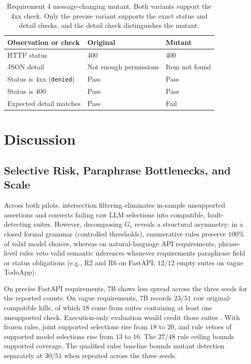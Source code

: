 \documentclass[sigconf,nonacm]{acmart}
\begin{document}
\begin{table}[t]
\caption{Requirement 4 message-changing mutant. Both variants support the 4xx check. Only the precise variant supports the exact status and detail checks, and the detail check distinguishes the mutant.}
\label{tab:example}
\centering\small
\begin{tabular}{@{}p{} p{} p{}@{}}
\toprule
Observation or check & Original & Mutant\\
\midrule
HTTP status & 400 & 400\\
JSON detail & {\raggedright Not enough permissions\par} & {\raggedright Item not found\par}\\
Status is 4xx (\texttt{denied}) & Pass & Pass\\
Status is 400 & Pass & Pass\\
Expected detail matches & Pass & Fail\\
\bottomrule
\end{tabular}
\end{table}

\section{Discussion}
\subsection{Selective Risk, Paraphrase Bottlenecks, and Scale}
Across both pilots, intersection filtering eliminates in-sample unsupported assertions and converts failing raw LLM selections into compatible, fault-detecting suites. However, decomposing $G_r$ reveals a structural asymmetry: in a closed formal grammar (controlled thresholds), enumerative rules preserve $100\%$ of valid model choices, whereas on natural-language API requirements, phrase-level rules veto valid semantic inferences whenever requirements paraphrase field or status obligations (e.g., R2 and R6 on FastAPI; $12/12$ empty suites on vague TodoApp).

On precise FastAPI requirements, 7B shows less spread across the three seeds for the reported counts. On vague requirements, 7B records $23/51$ raw original-compatible kills, of which $18$ come from suites containing at least one unsupported check. Execution-only evaluation would credit those suites \cite{konstantinou2024,ding2026}. With frozen rules, joint supported selections rise from $18$ to $20$, and rule vetoes of supported model selections rise from $13$ to $16$. The $27/48$ rule ceiling bounds supported coverage. The qualified rules baseline bounds mutant detection separately at $30/51$ when repeated across the three seeds.
\end{document}

